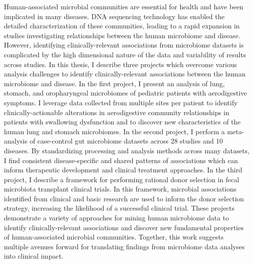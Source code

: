 
Human-associated microbial communities are essential for health and have been implicated in many diseases.
DNA sequencing technology has enabled the detailed characterization of these communities, leading to a rapid expansion in studies investigating relationships between the human microbiome and disease.
However, identifying clinically-relevant associations from microbiome datasets is complicated by the high dimensional nature of the data and variability of results across studies.
In this thesis, I describe three projects which overcome various analysis challenges to identify clinically-relevant associations between the human microbiome and disease.
In the first project, I present an analysis of lung, stomach, and oropharyngeal microbiomes of pediatric patients with aerodigestive symptoms.
I leverage data collected from multiple sites per patient to identify  clinically-actionable alterations in aerodigestive community relationships in patients with swallowing dysfunction and to discover new characteristics of the human lung and stomach microbiomes.
In the second project, I perform a meta-analysis of case-control gut microbiome datasets across 28 studies and 10 diseases.
By standardizing processing and analysis methods across many datasets, I find consistent disease-specific and shared patterns of associations which can inform therapeutic development and clinical treatment approaches.
In the third project, I describe a framework for performing rational donor selection in fecal microbiota transplant clinical trials.
In this framework, microbial associations identified from clinical and basic research are used to inform the donor selection strategy, increasing the likelihood of a successful clinical trial.
These projects demonstrate a variety of approaches for mining human microbiome data to identify clinically-relevant associations and discover new fundamental properties of human-associated microbial communities.
Together, this work suggests multiple avenues forward for translating findings from microbiome data analyses into clinical impact.
